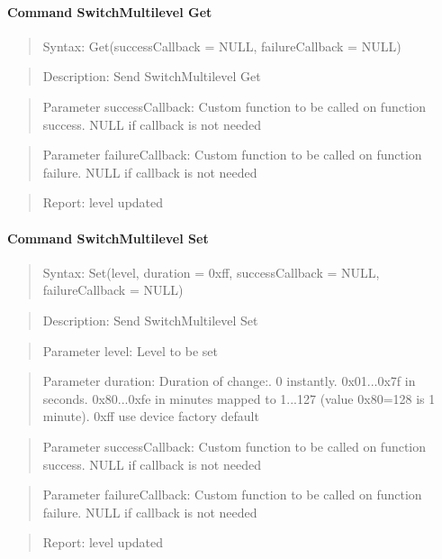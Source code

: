 \paragraph{Command SwitchMultilevel Get}
\begin{quote}Syntax: Get(successCallback = NULL, failureCallback = NULL)\end{quote}
\begin{quote}Description: Send SwitchMultilevel Get\end{quote}
\begin{quote}Parameter successCallback: Custom function to be called on function success. NULL if callback is not needed\end{quote}
\begin{quote}Parameter failureCallback: Custom function to be called on function failure. NULL if callback is not needed\end{quote}
\begin{quote}Report: level updated\end{quote}

\paragraph{Command SwitchMultilevel Set}
\begin{quote}Syntax: Set(level, duration = 0xff, successCallback = NULL, failureCallback = NULL)\end{quote}
\begin{quote}Description: Send SwitchMultilevel Set\end{quote}
\begin{quote}Parameter level: Level to be set\end{quote}
\begin{quote}Parameter duration: Duration of change:. 0 instantly. 0x01...0x7f in seconds. 0x80...0xfe in minutes mapped to 1...127 (value 0x80=128 is 1 minute). 0xff use device factory default\end{quote}
\begin{quote}Parameter successCallback: Custom function to be called on function success. NULL if callback is not needed\end{quote}
\begin{quote}Parameter failureCallback: Custom function to be called on function failure. NULL if callback is not needed\end{quote}
\begin{quote}Report: level updated\end{quote}

